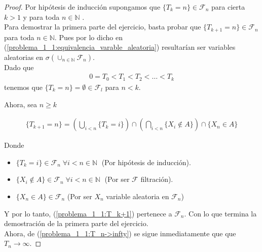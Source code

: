 \begin{proof}
	Por hipótesis de inducción supongamos que $\{T_k = n\} \in \mathscr{F}_n$ para cierta $k>1$ 
	y para toda $n \in \mathbb{N}$ . \\

	Para demostrar la primera parte del ejercicio, basta probar que $\{T_{k+1} = n\} \in \mathscr{F}_n$ para 
	toda $n \in \mathbb{N}$. Pues por lo dicho en (\ref{problema_1_1:equivalencia_varable_aleatoria}) resultarían ser 
	variables aleatorias en $\sigma(\cup_{n \in \mathbb{N}} \mathscr{F}_n)$.
	\\
	
	Dado que 
	\begin{align}\label{problema_1_1:T_n->infty}
		0=T_0<T_1<T_2<\dots<T_k
	\end{align}  
	tenemos que $\{ T_k = n\} = \emptyset \in \mathscr{F}_l$ para $n < k$. 
	
	Ahora, sea $n \geq k$
	
	\begin{align}\label{problema_1_1:T_k+1}
		\{ T_{k+1} = n\} = 
		\left( \bigcup_{i < n } \{T_k = i \} \right) 
		\cap 
		\left( \bigcap_{i < n} \{ X_i \not\in A \} \right)
		\cap
		\{ X_n \in A\}
	\end{align}
	
	
	Donde 
	\begin{itemize}
		\item	 $\{ T_k = i\} \in \mathscr{F}_n \; \forall i < n \in \mathbb{N} \; $ (Por hipótesis de inducción).	
		\item	 $\{ X_i \not \in A\} \in \mathscr{F}_n \; \forall i < n \in \mathbb{N} \;$ (Por ser $\mathscr{F}$ filtración).
		\item $\{ X_n \in A\} \in \mathscr{F}_n$ (Por ser $X_n$ variable aleatoria en $\mathscr{F}_n$)	
	\end{itemize}
	
	Y por lo tanto, (\ref{problema_1_1:T_k+1}) pertenece a $\mathscr{F}_n$. Con lo que termina la demostración de la primera parte del ejercicio.\\
	
	Ahora, de (\ref{problema_1_1:T_n->infty}) se sigue inmediatamente que que $T_n \rightarrow \infty$.
\end{proof}